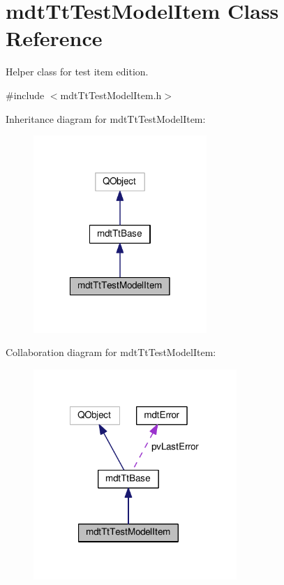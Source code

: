\hypertarget{classmdt_tt_test_model_item}{\section{mdt\-Tt\-Test\-Model\-Item Class Reference}
\label{classmdt_tt_test_model_item}
}


Helper class for test item edition.  




{\ttfamily \#include $<$mdt\-Tt\-Test\-Model\-Item.\-h$>$}



Inheritance diagram for mdt\-Tt\-Test\-Model\-Item\-:\nopagebreak
\begin{figure}[H]
\begin{center}
\leavevmode
\includegraphics[width=186pt]{classmdt_tt_test_model_item__inherit__graph}
\end{center}
\end{figure}


Collaboration diagram for mdt\-Tt\-Test\-Model\-Item\-:\nopagebreak
\begin{figure}[H]
\begin{center}
\leavevmode
\includegraphics[width=218pt]{classmdt_tt_test_model_item__coll__graph}
\end{center}
\end{figure}
